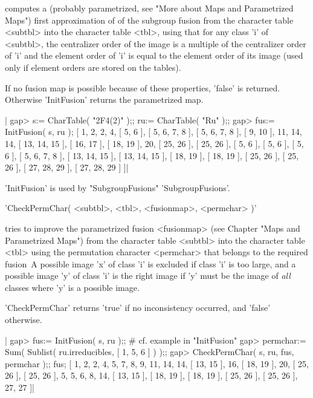 computes a (probably parametrized, see "More about Maps and Parametrized
Maps") first approximation of of the subgroup fusion from the character
table <subtbl> into the character table <tbl>, using that for any class 'i'
of <subtbl>, the centralizer order of the image is a multiple of the
centralizer order of 'i' and the element order of 'i' is equal to the
element order of its image (used only if element orders are stored on the
tables).

If no fusion map is possible because of these properties, 'false' is returned.
Otherwise 'InitFusion' returns the parametrized map.

|    gap> s:= CharTable( "2F4(2)" );; ru:= CharTable( "Ru" );;
    gap> fus:= InitFusion( s, ru );
    [ 1, 2, 2, 4, [ 5, 6 ], [ 5, 6, 7, 8 ], [ 5, 6, 7, 8 ], [ 9, 10 ], 
      11, 14, 14, [ 13, 14, 15 ], [ 16, 17 ], [ 18, 19 ], 20, [ 25, 26 ],
      [ 25, 26 ], [ 5, 6 ], [ 5, 6 ], [ 5, 6 ], [ 5, 6, 7, 8 ],
      [ 13, 14, 15 ], [ 13, 14, 15 ], [ 18, 19 ], [ 18, 19 ], [ 25, 26 ],
      [ 25, 26 ], [ 27, 28, 29 ], [ 27, 28, 29 ] ]|

'InitFusion' is used by "SubgroupFusions" 'SubgroupFusions'.


'CheckPermChar( <subtbl>, <tbl>, <fusionmap>, <permchar> )'

tries to  improve the parametrized  fusion <fusionmap> (see Chapter "Maps
and  Parametrized  Maps") from  the  character  table  <subtbl> into  the
character table  <tbl>  using  the permutation character  <permchar> that
belongs to the required fusion\:\  A possible  image 'x'  of class 'i' is
excluded if class 'i' is too large, and a possible image 'y' of class 'i'
is  the right  image  if 'y' must be the image of {\em all} classes where
'y' is a possible image.

'CheckPermChar'  returns 'true'  if  no  inconsistency  occurred,  and
'false' otherwise.

|    gap> fus:= InitFusion( s, ru );; # cf. example in "InitFusion"
    gap> permchar:= Sum( Sublist( ru.irreducibles, [ 1, 5, 6 ] ) );;
    gap> CheckPermChar( s, ru, fus, permchar );; fus;
    [ 1, 2, 2, 4, 5, 7, 8, 9, 11, 14, 14, [ 13, 15 ], 16, [ 18, 19 ], 20, 
      [ 25, 26 ], [ 25, 26 ], 5, 5, 6, 8, 14, [ 13, 15 ], [ 18, 19 ],
      [ 18, 19 ], [ 25, 26 ], [ 25, 26 ], 27, 27 ]|

